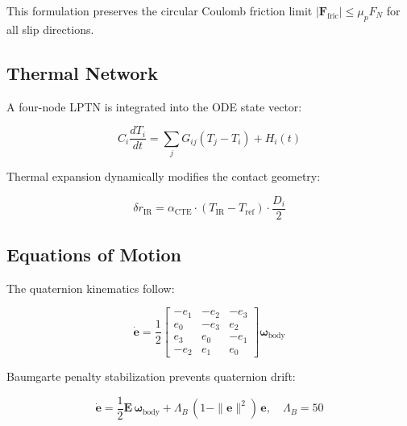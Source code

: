 \documentclass[machines,article,submit,pdftex,moreauthors]{Definitions/mdpi}
\begin{document}
This formulation preserves the circular Coulomb friction limit $|\bm{F}_{\text{fric}}| \leq \mu_p F_N$ for all slip directions.


\subsection{Thermal Network}
\label{sec:thermal}

A four-node LPTN is integrated into the ODE state vector:

\begin{linenomath}
\begin{equation}
    C_i \frac{dT_i}{dt} = \sum_j G_{ij}(T_j - T_i) + H_i(t)
    \label{eq:thermal_ode}
\end{equation}
\end{linenomath}

Thermal expansion dynamically modifies the contact geometry:

\begin{linenomath}
\begin{equation}
    \delta r_{\text{IR}} = \alpha_{\text{CTE}} \cdot (T_{\text{IR}} - T_{\text{ref}}) \cdot \frac{D_i}{2}
    \label{eq:thermal_expansion}
\end{equation}
\end{linenomath}


\subsection{Equations of Motion}
\label{sec:eom}

The quaternion kinematics follow:

\begin{linenomath}
\begin{equation}
    \dot{\bm{e}} = \frac{1}{2} \begin{bmatrix}
        -e_1 & -e_2 & -e_3 \\
        e_0 & -e_3 & e_2 \\
        e_3 & e_0 & -e_1 \\
        -e_2 & e_1 & e_0
    \end{bmatrix} \bm{\omega}_{\text{body}}
    \label{eq:quat_kin}
\end{equation}
\end{linenomath}

Baumgarte penalty stabilization prevents quaternion drift:

\begin{linenomath}
\begin{equation}
    \dot{\bm{e}} = \frac{1}{2}\mathbf{E}\,\bm{\omega}_{\text{body}} + \Lambda_B\,(1 - \|\bm{e}\|^2)\,\bm{e}, \quad \Lambda_B = 50
    \label{eq:baumgarte}
\end{equation}
\end{linenomath}
\end{document}
